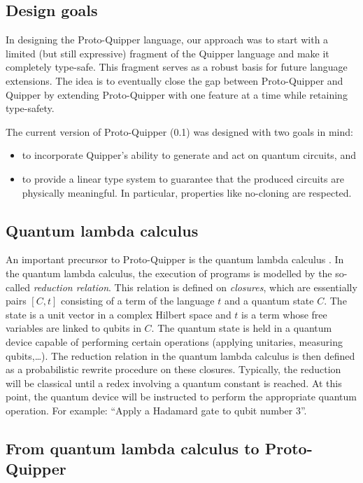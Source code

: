 \documentclass[twoside]{article}
\begin{document}
\subsection{Design goals}\label{ssec-goals}

In designing the Proto-Quipper language, our approach was to start
with a limited (but still expressive) fragment of the Quipper language
and make it completely type-safe.  This fragment serves as a robust
basis for future language extensions. The idea is to eventually close
the gap between Proto-Quipper and Quipper by extending Proto-Quipper
with one feature at a time while retaining type-safety. 

The current version of Proto-Quipper (0.1) was designed with two goals
in mind:
\begin{itemize}
  \item to incorporate Quipper's ability to generate and act on 
  quantum circuits, and 
\item to provide a linear type system to guarantee that the produced
  circuits are physically meaningful. In particular, properties like
  no-cloning are respected.
\end{itemize}

\subsection{Quantum lambda calculus}

An important precursor to Proto-Quipper is the quantum lambda calculus
{\cite{SeVa09}}. In the quantum lambda calculus, the execution of
programs is modelled by the so-called {\em reduction relation}. This
relation is defined on \emph{closures}, which are essentially pairs
$[C,t]$ consisting of a term of the language $t$ and a quantum state
$C$. The state is a unit vector in a complex Hilbert space and $t$ is
a term whose free variables are linked to qubits in $C$. The quantum
state is held in a quantum device capable of performing certain
operations (applying unitaries, measuring qubits,\ldots). The
reduction relation in the quantum lambda calculus is then defined as a
probabilistic rewrite procedure on these closures. Typically, the
reduction will be classical until a redex involving a quantum constant
is reached. At this point, the quantum device will be instructed to
perform the appropriate quantum operation. For example: ``Apply a
Hadamard gate to qubit number 3''.

\subsection{From quantum lambda calculus to Proto-Quipper}
\end{document}

